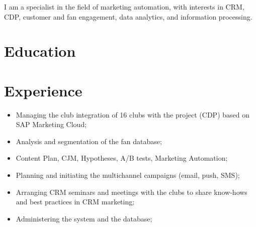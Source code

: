 \documentclass[11pt,a4paper,sans]{moderncv}
\begin{document}
 

\makecvtitle

I am a specialist in the field of marketing automation, with interests in CRM, CDP, customer and fan engagement, data analytics, and information processing.

\section{Education}


\section{Experience}


\begin{itemize}
\item Managing the club integration of 16 clubs with the project (CDP) based on SAP Marketing
Cloud;
\item Analysis and segmentation of the fan database;
\item Content Plan, CJM, Hypotheses, A/B tests, Marketing Automation;
\item Planning and initiating the multichannel campaigns (email, push, SMS);
\item Arranging CRM seminars and meetings with the clubs to share know-hows and best practices in CRM marketing;
\item Administering the system and the database;\newline{}
\end{itemize}

\end{document}
